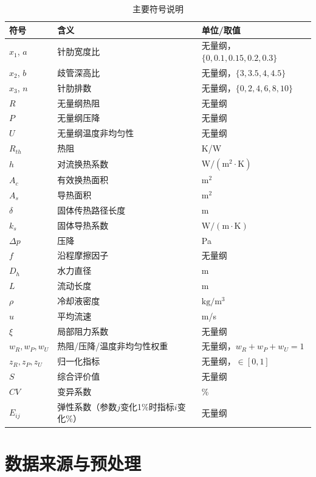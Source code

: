 \documentclass[12pt,a4paper]{ctexart}
\begin{document}
\begin{table}[H]
\centering
\caption{主要符号说明}
\footnotesize
\begin{tabular}{p{}p{}p{}}
\toprule
符号 & 含义 & 单位/取值 \\
\midrule
$x_1$, $a$ & 针肋宽度比 & 无量纲，$\{0,0.1,0.15,0.2,0.3\}$ \\
$x_2$, $b$ & 歧管深高比 & 无量纲，$\{3,3.5,4,4.5\}$ \\
$x_3$, $n$ & 针肋排数 & 无量纲，$\{0,2,4,6,8,10\}$ \\
$R$ & 无量纲热阻 & 无量纲 \\
$P$ & 无量纲压降 & 无量纲 \\
$U$ & 无量纲温度非均匀性 & 无量纲 \\
$R_{th}$ & 热阻 & K/W \\
$h$ & 对流换热系数 & $\mathrm{W/(m^{2}\cdot K)}$ \\
$A_c$ & 有效换热面积 & $\mathrm{m^{2}}$ \\
$A_s$ & 导热面积 & $\mathrm{m^{2}}$ \\
$\delta$ & 固体传热路径长度 & m \\
$k_s$ & 固体导热系数 & $\mathrm{W/(m\cdot K)}$ \\
$\Delta p$ & 压降 & Pa \\
$f$ & 沿程摩擦因子 & 无量纲 \\
$D_h$ & 水力直径 & m \\
$L$ & 流动长度 & m \\
$\rho$ & 冷却液密度 & $\mathrm{kg/m^{3}}$ \\
$u$ & 平均流速 & m/s \\
$\xi$ & 局部阻力系数 & 无量纲 \\
$w_R,w_P,w_U$ & 热阻/压降/温度非均匀性权重 & 无量纲，$w_R+w_P+w_U=1$ \\
$z_R,z_P,z_U$ & 归一化指标 & 无量纲，$\in[0,1]$ \\
$S$ & 综合评价值 & 无量纲 \\
$CV$ & 变异系数 & \% \\
$E_{ij}$ & 弹性系数（参数$j$变化1\%时指标$i$变化\%） & 无量纲 \\
\bottomrule
\end{tabular}
\end{table}

\section{数据来源与预处理}
\end{document}

